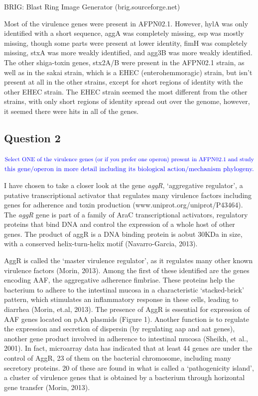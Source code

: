 \documentclass[12pt,]{article}
\begin{document}
\begin{center} BRIG: Blast Ring Image Generator (brig.sourceforge.net) \end{center}

Most of the virulence genes were present in AFPN02.1. However, hylA was
only identified with a short sequence, aggA was completely missing, esp
was mostly missing, though some parts were present at lower identity,
fimH was completely missing, stxA was more weakly identified, and agg3B
was more weakly identified. The other shiga-toxin genes, stx2A/B were
present in the AFPN02.1 strain, as well as in the sakai strain, which is
a EHEC (enterohemmoragic) strain, but isn't present at all in the other
strains, except for short regions of identity with the other EHEC
strain. The EHEC strain seemed the most different from the other
strains, with only short regions of identity spread out over the genome,
however, it seemed there were hits in all of the genes.

\subsection{Question 2}\label{question-2}

\(\color{blue}{\text{Select ONE of the virulence genes (or if you prefer one operon) present in AFPN02.1
and study}}\)
\(\color{blue}{\text{this gene/operon in more detail including its biological action/mechanism phylogeny.}}\)

I have chosen to take a closer look at the gene \emph{aggR},
`aggregative regulator', a putative transcriptional activator that
regulates many virulence factors including genes for adherence and toxin
production (www.uniprot.org/uniprot/P43464). The \emph{aggR} gene is
part of a family of AraC transcriptional activators, regulatory proteins
that bind DNA and control the expression of a whole host of other genes.
The product of aggR is a DNA binding protein is aobut 30KDa in size,
with a conserved helix-turn-helix motif (Navarro-Garcia, 2013).

AggR is called the `master virulence regulator', as it regulates many
other known virulence factors (Morin, 2013). Among the first of these
identified are the genes encoding AAF, the aggregative adherence
fimbriae. These proteins help the bacterium to adhere to the intestinal
mucosa in a characteristic `stacked-brick' pattern, which stimulates an
inflammatory response in these cells, leading to diarrhea (Morin, et.al,
2013). The presence of AggR is essential for expression of AAF genes
located on pAA plasmids (Figure 1). Another function is to regulate the
expression and secretion of dispersin (by regulating aap and aat genes),
another gene product involved in adherence to intestinal mucosa (Sheikh,
et al., 2001). In fact, microarray data has indicated that at least 44
genes are under the control of AggR, 23 of them on the bacterial
chromosome, including many secretory proteins. 20 of these are found in
what is called a `pathogenicity island', a cluster of virulence genes
that is obtained by a bacterium through horizontal gene transfer (Morin,
2013).
\end{document}
